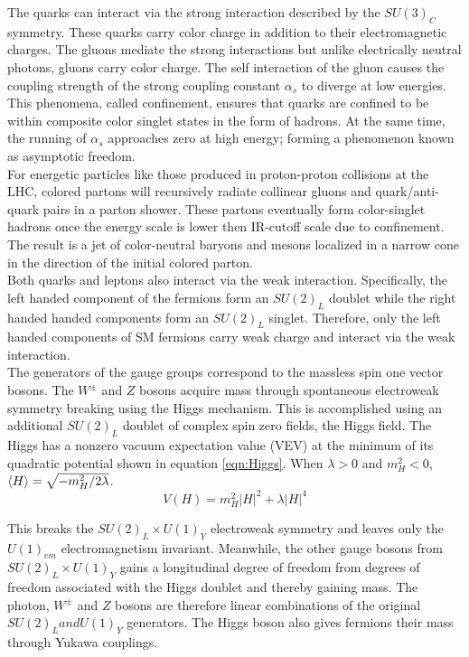 \indent The quarks can interact via the strong interaction described by the $SU(3)_C$ symmetry.  These quarks carry color charge in addition to their electromagnetic charges.  The gluons mediate the strong interactions but unlike electrically neutral photons, gluons carry color charge.  The self interaction of the gluon causes the coupling strength of the strong coupling constant $\alpha_s$ to diverge at low energies.  This phenomena, called confinement, ensures that quarks are confined to be within composite color singlet states in the form of hadrons.  At the same time, the running of $\alpha_s$ approaches zero at high energy; forming a phenomenon known as asymptotic freedom. \\

\indent For energetic particles like those produced in proton-proton collisions at the LHC, colored partons will recursively radiate collinear gluons and quark/anti-quark pairs in a parton shower. These partons eventually form color-singlet hadrons once the energy scale is lower then IR-cutoff scale due to confinement.  The result is a jet of color-neutral baryons and mesons localized in a narrow cone in the direction of the initial colored parton. \\

\indent Both quarks and leptons also interact via the weak interaction.  Specifically, the left handed component of the fermions form an $SU(2)_L$ doublet while the right handed handed components form an $SU(2)_L$ singlet.  Therefore, only the left handed components of SM fermions carry weak charge and interact via the weak interaction.  \\

\indent The generators of the gauge groups correspond to the massless spin one vector bosons.  The $W^\pm$ and $Z$ bosons acquire mass through spontaneous electroweak symmetry breaking using the Higgs mechanism.  This is accomplished using an additional $SU(2)_L$ doublet of complex spin zero fields, the Higgs field.  The Higgs has a nonzero vacuum expectation value (VEV) at the minimum of its quadratic potential shown in equation \ref{eqn:Higgs}.  When $\lambda > 0$ and $m_H^2 < 0 $, $\braket{H} = \sqrt{-m_H^2/2\lambda}$.  \\

\begin{equation}
\label{eqn:Higgs}
V(H) = m_H^2 |H|^2 +\lambda |H|^4
\end{equation}

\indent This breaks the $SU(2)_L \times U(1)_Y$ electroweak symmetry and leaves only the $U(1)_{em}$ electromagnetism invariant.  Meanwhile, the other gauge bosons from $SU(2)_L \times U(1)_Y$ gains a longitudinal degree of freedom from degrees of freedom associated with the Higgs doublet and thereby gaining mass.  The photon, $W^\pm$ and $Z$ bosons are therefore linear combinations of the original $SU(2)_L and U(1)_Y$ generators.  The Higgs boson also gives fermions their mass through Yukawa couplings. \\

